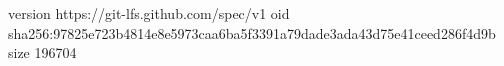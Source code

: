 version https://git-lfs.github.com/spec/v1
oid sha256:97825e723b4814e8e5973caa6ba5f3391a79dade3ada43d75e41ceed286f4d9b
size 196704
